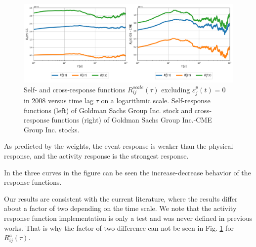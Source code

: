 \begin{figure}[htbp]
    \centering
    \includegraphics[width=\textwidth]
    {figures/03_response_comparison_2008_GSi_CMEj.png}
    \caption{Self- and cross-response functions
             $R^{scale}_{ij}\left(\tau\right)$ excluding
             $\varepsilon^{p}_{j}\left(t\right) = 0$ in 2008 versus time lag
             $\tau$ on a logarithmic scale. Self-response functions (left) of
             Goldman Sachs Group Inc. stock and cross-response functions
             (right) of Goldman Sachs Group Inc.-CME Group Inc. stocks.}
    \label{fig:relation_responses}
\end{figure}

As predicted by the weights, the event response is weaker than the physical
response, and the activity response is the strongest response.

In the three curves in the figure can be seen the increase-decrease behavior of
the response functions.

Our results are consistent with the current literature, where the results
differ about a factor of two depending on the time scale. We note that the
activity response function implementation is only a test and was never defined
in previous works. That is why the factor of two difference can not be seen in
Fig. \ref{fig:relation_responses} for $R_{ij}^{a} \left( \tau \right)$.
